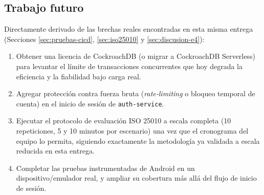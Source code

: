 \subsection{Trabajo futuro}

Directamente derivado de las brechas reales encontradas en esta misma entrega (Secciones
\ref{sec:pruebas-cicd}, \ref{sec:iso25010} y \ref{sec:discusion-e4}):

\begin{enumerate}[nosep]
  \item Obtener una licencia de CockroachDB (o migrar a CockroachDB Serverless) para levantar el
        límite de transacciones concurrentes que hoy degrada la eficiencia y la fiabilidad bajo
        carga real.
  \item Agregar protección contra fuerza bruta (\emph{rate-limiting} o bloqueo temporal de cuenta)
        en el inicio de sesión de \texttt{auth-service}.
  \item Ejecutar el protocolo de evaluación ISO 25010 a escala completa (10 repeticiones, 5 y 10
        minutos por escenario) una vez que el cronograma del equipo lo permita, siguiendo
        exactamente la metodología ya validada a escala reducida en esta entrega.
  \item Completar las pruebas instrumentadas de Android en un dispositivo/emulador real, y ampliar
        su cobertura más allá del flujo de inicio de sesión.
\end{enumerate}
